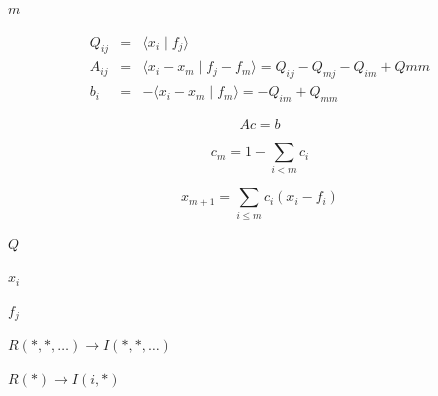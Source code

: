 \documentclass{article}
\begin{document}
$ m $
\pagebreak

\begin{eqnarray*}Q_{i j} & = & \langle x_i \mid f_j \rangle \\
A_{i j} & = & \langle x_i - x_m \mid f_j - f_m \rangle = Q_{i j} - Q_{m j} - Q_{i m} + Q{m m} \\
b_i & =& -\langle x_i - x_m \mid f_m \rangle = -Q_{i m} + Q_{m m}
\end{eqnarray*}
\pagebreak

\[A c = b
\]
\pagebreak

\[c_m = 1 - \sum_{i<m} c_i
\]
\pagebreak

\[x_{m+1} = \sum_{i \le m}{c_i ( x_i - f_i)}
\]
\pagebreak

$ Q $
\pagebreak

$ x_i $
\pagebreak

$ f_j $
\pagebreak

$ R(*,*,\ldots) \rightarrow I(*,*,\ldots) $
\pagebreak

$ R(*) \rightarrow I(i,*) $
\pagebreak
\end{document}
